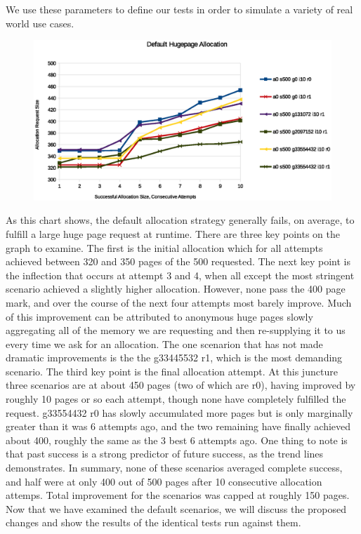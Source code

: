 \documentclass{article}
\begin{document}
We use these parameters to define our tests in order to simulate a variety of real world use cases. 
\begin{figure}[h!]
	\includegraphics[width=\linewidth]{./datums/default_alloc.eps}
	\label{fig:default_alloc}
\end{figure}

As this chart shows, the default allocation strategy generally fails, on average, to fulfill a large huge page request at runtime. There are three key points on the graph to examine. The first is the initial allocation which for all attempts achieved between 320 and 350 pages of the 500 requested. The next key point is the inflection that occurs at attempt 3 and 4, when all except the most stringent scenario achieved a slightly higher allocation. However, none pass the 400 page mark, and over the course of the next four attempts most barely improve. Much of this improvement can be attributed to anonymous huge pages slowly aggregating all of the memory we are requesting and then re-supplying it to us every time we ask for an allocation. The one scenarion that has not made dramatic improvements is the the g33445532 r1, which is the most demanding scenario. The third key point is the final allocation attempt. At this juncture three scenarios are at about 450 pages (two of which are r0), having improved by roughly 10 pages or so each attempt, though none have completely fulfilled the request. g33554432 r0 has slowly accumulated more pages but is only marginally greater than it was 6 attempts ago, and the two remaining have finally achieved about 400, roughly the same as the 3 best 6 attempts ago. One thing to note is that past success is a strong predictor of future success, as the trend lines demonstrates. In summary, none of these scenarios averaged complete success, and half were at only 400 out of 500 pages after 10 consecutive allocation attemps. Total improvement for the scenarios was capped at roughly 150 pages. Now that we have examined the default scenarios, we will discuss the proposed changes and show the results of the identical tests run against them.
\end{document}
